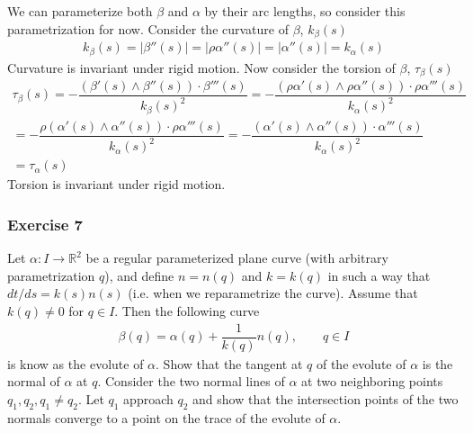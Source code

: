 \documentclass{article}
\newcommand{\R}{\mathbb{R}}
\begin{document}
	We can parameterize both $\beta$ and $\alpha$ by their arc lengths, so consider this parametrization for now. Consider the curvature of $\beta$, $k_{\beta}(s)$
	\begin{gather*}
		k_{\beta}(s) = |\beta''(s)| = |\rho \alpha''(s)| = |\alpha''(s)| = k_{\alpha}(s)
	\end{gather*}
	Curvature is invariant under rigid motion. Now consider the torsion of $\beta$, $\tau_{\beta}(s)$
	\begin{gather*}
		\tau_{\beta}(s)
		= - \dfrac{ ( \beta'(s) \wedge \beta''(s) ) \cdot \beta'''(s) }{ k_{\beta}(s)^2 }
		= -\dfrac{ ( \rho \alpha'(s) \wedge \rho \alpha''(s) ) \cdot \rho \alpha'''(s) }{ k_{\alpha}(s)^2 } \\
		= -\dfrac{ \rho ( \alpha'(s) \wedge \alpha''(s) ) \cdot \rho \alpha'''(s) }{ k_{\alpha}(s)^2 }
		= -\dfrac{ ( \alpha'(s) \wedge \alpha''(s) ) \cdot \alpha'''(s) }{ k_{\alpha}(s)^2 } \\
		= \tau_{\alpha}(s)
	\end{gather*}
	Torsion is invariant under rigid motion.
	
	\subsubsection*{Exercise 7}
	Let $\alpha : I \to \R^2$ be a regular parameterized plane curve (with arbitrary parametrization $q$), and define $n = n(q)$ and $k = k(q)$ in such a way that $dt/ds = k(s) n(s)$ (i.e. when we reparametrize the curve). Assume that $k(q) \neq 0$ for $q \in I$. Then the following curve
	\begin{gather*}
		\beta(q) = \alpha(q) + \dfrac{1}{k(q)} n(q), \qquad q \in I
	\end{gather*}
	is know as the evolute of $\alpha$. Show that the tangent at $q$ of the evolute of $\alpha$ is the normal of $\alpha$ at $q$. Consider the two normal lines of $\alpha$ at two neighboring points $q_1, q_2, q_1 \neq q_2$. Let $q_1$ approach $q_2$ and show that the intersection points of the two normals converge to a point on the trace of the evolute of $\alpha$.
	
\end{document}
